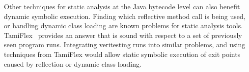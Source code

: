 %
Other techniques for static analysis at the Java bytecode level can also benefit dynamic symbolic execution.
%
Finding which reflective method call is being used, or handling dynamic class loading are known problems for static analysis tools.
%
TamiFlex~\cite{tamiflex} provides an answer that is sound with respect to a set of previously seen program runs.
%
Integrating veritesting runs into similar problems, and using techniques from TamiFlex would allow static symbolic execution of exit points caused by reflection or dynamic class loading. 
